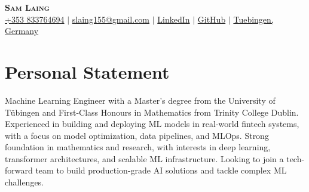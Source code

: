 \documentclass[letterpaper,10pt]{article}
\begin{document}

\begin{center}
    \textbf{\Huge \scshape Sam Laing} \\ \vspace{3pt}
    \small
    \faMobile \hspace{.5pt} \href{tel:353833764694}{+353 833764694}
    $|$
    \faAt \hspace{.5pt} \href{slaing155@gmail.com}{slaing155@gmail.com}
    $|$
    \faLinkedinSquare \hspace{.5pt} \href{https://www.linkedin.com/in/sam-laing-196403214}{LinkedIn}
    $|$
    \faGithub \hspace{.5pt} \href{https://github.com/sam-laing}{GitHub}
    $|$
    \faMapMarker \hspace{.5pt} \href{https://maps.app.goo.gl/zDdAp6SFpdj8fM548}{Tuebingen, Germany}
\end{center}

\section{Personal Statement}
Machine Learning Engineer with a Master’s degree from the University of Tübingen and First-Class Honours in Mathematics from Trinity College Dublin. Experienced in building and deploying ML models in real-world fintech systems, with a focus on model optimization, data pipelines, and MLOps. Strong foundation in mathematics and research, with interests in deep learning, transformer architectures, and scalable ML infrastructure. Looking to join a tech-forward team to build production-grade AI solutions and tackle complex ML challenges.


\end{document}
